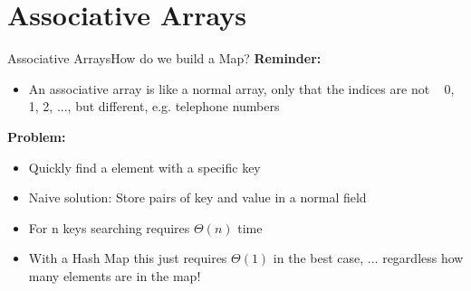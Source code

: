 \section{Associative Arrays}


\begin{frame}{Associative Arrays}{How do we build a Map?}
  \textbf{Reminder:}
  \begin{itemize}
  \item An associative array is like a normal array, only that
    the indices are not {\color{Mittel-Blau}~ 0, 1, 2, ...}, but
    different, e.g. telephone numbers
  \end{itemize}
  \textbf{Problem:}
  \begin{itemize}
  \item Quickly find a element with a specific key
  \item Naive solution: Store pairs of key and value
    in a normal field
  \item For {\color{Mittel-Blau} n } keys searching requires {\color{Mittel-Blau} $\Theta(n)$} time
  \item With a {\color{Mittel-Blau} Hash Map } this just requires {\color{Mittel-Blau} $\Theta(1)$}
    in the best case, ... regardless how many elements are in the map!
  \end{itemize}
\end{frame}


